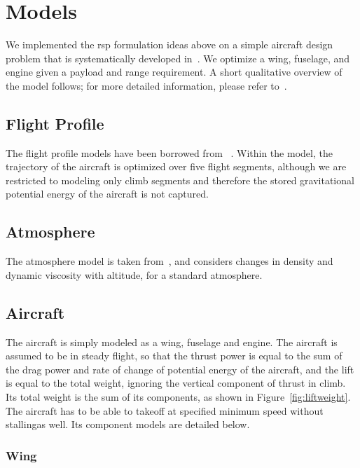 \section{Models}

We implemented the \gls{rsp} formulation ideas above on a simple aircraft design problem that is systematically developed in~\cite{Ozturk2018}.
We optimize a wing, fuselage, and engine given a payload and range requirement. A short qualitative overview of the model follows; for
more detailed information, please refer to~\cite{Ozturk2018}.

\subsection{Flight Profile}

The flight profile models have been borrowed from ~\cite{York2018}. Within the model, the
trajectory of the aircraft is optimized over five flight segments,
although we are restricted to modeling only climb segments
and therefore the stored gravitational potential energy of the aircraft is not captured.

\subsection{Atmosphere}

The atmosphere model is taken from~\cite{Tao2018}, and considers changes in density and dynamic
viscosity with altitude, for a standard atmosphere.

\subsection{Aircraft}

The aircraft is simply modeled as a wing, fuselage and engine. The aircraft is assumed
to be in steady flight, so that the thrust power is equal to the sum of the drag power and rate of change
of potential energy of the aircraft, and the lift is equal to the total weight, ignoring the vertical component of
thrust in climb. Its total weight is the sum of its components, as shown in Figure~\ref{fig:liftweight}.
The aircraft has to be able to takeoff at specified minimum speed without stallingas well.
Its component models are detailed below.

\subsubsection{Wing}

